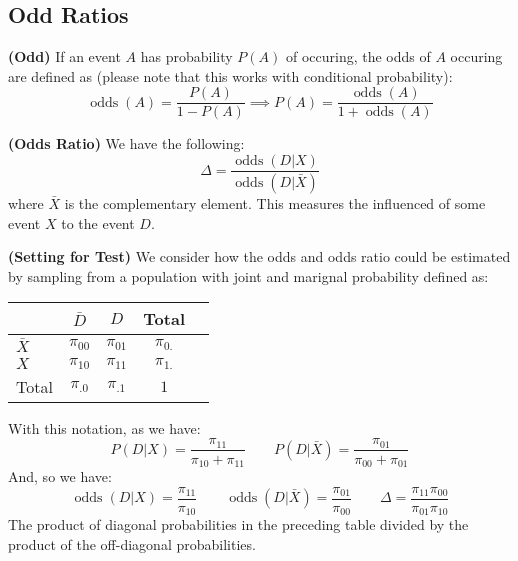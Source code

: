 \subsection{Odd Ratios}

\begin{definition}{\textbf{(Odd)}}
    If an event $A$ has probability $P(A)$ of occuring, the odds of $A$ occuring are defined as (please note that this works with conditional probability):
    \begin{equation*}
        \operatorname{odds}(A) = \frac{P(A)}{1-P(A)} \implies P(A) = \frac{\operatorname{odds}(A)}{1+\operatorname{odds}(A)}
    \end{equation*}
\end{definition}

\begin{definition}{\textbf{(Odds Ratio)}}
    We have the following:
    \begin{equation*}
        \Delta = \frac{\operatorname{odds}(D | X)}{\operatorname{odds}(D|\bar{X})}
    \end{equation*}
    where $\bar{X}$ is the complementary element. This measures the influenced of some event $X$ to the event $D$.
\end{definition}

\begin{remark}{\textbf{(Setting for Test)}}
    We consider how the odds and odds ratio could be estimated by sampling from a population with joint and marignal probability defined as:
    \begin{table}[H]
    \centering
    \begin{tabular}{lcccc}
        \toprule
        \textbf{}     & $\bar{D}$ & $D$ & Total  \\
        \midrule
        $\bar{X}$ & $\pi_{00}$ & $\pi_{01}$ & $\pi_{0.}$ \\
        $X$ & $\pi_{10}$ & $\pi_{11}$ & $\pi_{1.}$ \\
        Total & $\pi_{.0}$ & $\pi_{.1}$ & $1$ \\
        \bottomrule
    \end{tabular}
    \end{table}
    With this notation, as we have:
    \begin{equation*}
        P(D | X) =\frac{\pi_{11}}{\pi_{10} + \pi_{11}} \qquad P(D|\bar{X}) = \frac{\pi_{01}}{\pi_{00} + \pi_{01}}
    \end{equation*}
    And, so we have:
    \begin{equation*}
        \operatorname{odds}(D | X) = \frac{\pi_{11}}{\pi_{10}}
        \qquad \operatorname{odds}(D | \bar{X}) = \frac{\pi_{01}}{\pi_{00}} \qquad \Delta = \frac{\pi_{11}\pi_{00}}{\pi_{01}\pi_{10}}
    \end{equation*}
    The product of diagonal probabilities in the preceding table divided by the product of the off-diagonal probabilities.
\end{remark}

